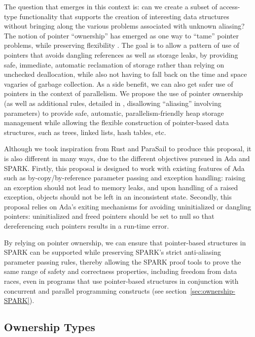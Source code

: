 \documentclass{llncs}
\begin{document}
The question that emerges in this context is: can we create a subset of access-type functionality that supports the creation of interesting data structures without bringing along
the various problems associated with unknown aliasing? The notion of pointer ``ownership'' has emerged as one way to ``tame'' pointer problems, while preserving flexibility \cite{POM}.  The goal is to allow a pattern of use
of pointers that avoids dangling references as well as storage leaks, by providing safe, immediate, automatic reclamation of storage rather than relying on unchecked deallocation,
while also not having to fall back on the time and space vagaries of garbage collection.  As a side benefit, we can also get safer use of pointers in the context of parallelism.
We propose the use of pointer ownership (as well as additional rules, detailed in \cite{AI2018}, disallowing ``aliasing'' involving parameters) to provide safe,
automatic, parallelism-friendly heap storage management while allowing the flexible construction of pointer-based data structures, such as trees, linked lists, hash tables, etc.

Although we took inspiration from Rust and ParaSail to produce this proposal, it is also different in many ways, due to the different objectives pursued in Ada and SPARK. Firstly,
this proposal is designed to work with existing features of Ada such as by-copy/by-reference parameter passing and exception handling: raising an exception should not lead to
memory leaks, and upon handling of a raised exception, objects should not be left in an inconsistent state. Secondly, this proposal relies on Ada's exiting mechanisms
for avoiding uninitialized or dangling pointers: uninitialized and freed pointers should be set to null so that dereferencing such pointers results in a run-time error.

By relying on pointer ownership, we can ensure that pointer-based
structures in SPARK can be supported while preserving SPARK's
strict anti-aliasing parameter passing rules,
thereby allowing the SPARK proof tools to prove the same
range of safety and correctness properties, including freedom from
data races, even in programs that use
pointer-based structures in conjunction with concurrent and
parallel programming constructs (see section~\ref{sec:ownership-SPARK}).

\subsection{Ownership Types}
\label{sec:ownership}
\end{document}
